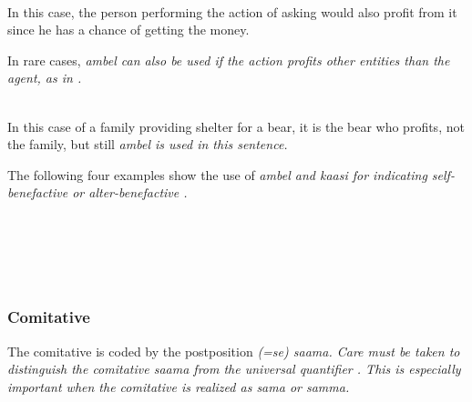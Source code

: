  \\
In this case, the person performing the action of asking would also profit from it since he has a chance of getting the money.

In rare cases, \em ambel \em can also be used if the action profits other entities than the agent, as in .

 \\
In this case of a family providing shelter for a bear, it is the bear who profits, not the family, but still \em ambel \em is used in this sentence.

The following four examples show the use of \em ambel \em and \em kaasi \em for indicating self-benefactive  or alter-benefactive .


 \\


 \\

 \\
 \\


\subsubsection{Comitative}\label{sec:func:Comitative}
The comitative is coded by the postposition \em (=se) saama\em{}. Care must be taken to distinguish the comitative \em saama \em from the universal quantifier . This is especially important when the comitative is realized as \em sama \em or \em samma\em.

